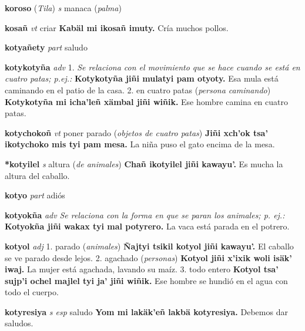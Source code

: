 \documentclass[10pt]{scrbook}
\newcommand{\entry}[1]{\textbf{#1}}
\newcommand{\onedefinition}[1]{#1.}
\newcommand{\nontranslationdef}[1]{\textit{#1}}
\newcommand{\partofspeech}[1]{\textit{#1}}
\newcommand{\spanishtranslation}[1]{#1}
\newcommand{\clarification}[1]{(\textit{#1})}
\newcommand{\cholexample}[1]{\textbf{#1}}
\newcommand{\exampletranslation}[1]{#1}
\newcommand{\relevantdialect}[1]{(\textit{#1})}
\begin{document}
\begin{multicols}{2}
\entry{koroso}
\relevantdialect{Tila}
\partofspeech{s}
\spanishtranslation{manaca}
\clarification{palma}

\entry{kosañ}
\partofspeech{vt}
\spanishtranslation{criar}
\cholexample{Kabäl mi ikosañ imuty.}
\exampletranslation{Cría muchos pollos.}

\entry{kotyañety}
\partofspeech{part}
\spanishtranslation{saludo}

\entry{kotykotyña}
\partofspeech{adv}
\onedefinition{1}
\nontranslationdef{Se relaciona con el movimiento que se hace cuando se está en cuatro patas; p.ej.:}
\cholexample{Kotykotyña jiñi mulatyi pam otyoty.}
\exampletranslation{Esa mula está caminando en el patio de la casa.}
\onedefinition{2}
\spanishtranslation{en cuatro patas}
\clarification{persona caminando}
\cholexample{Kotykotyña mi icha'leñ xämbal jiñi wiñik.}
\exampletranslation{Ese hombre camina en cuatro patas.}

\entry{kotychokoñ}
\partofspeech{vt}
\spanishtranslation{poner parado}
\clarification{objetos de cuatro patas}
\cholexample{Jiñi xch'ok tsa' ikotychoko mis tyi pam mesa.}
\exampletranslation{La niña puso el gato encima de la mesa.}

\entry{*kotyilel}
\partofspeech{s}
\spanishtranslation{altura}
\clarification{de animales}
\cholexample{Chañ ikotyilel jiñi kawayu'.}
\exampletranslation{Es mucha la altura del caballo.}

\entry{kotyo}
\partofspeech{part}
\spanishtranslation{adiós}

\entry{kotyokña}
\partofspeech{adv}
\nontranslationdef{Se relaciona con la forma en que se paran los animales; p. ej.:}
\cholexample{Kotyokña jiñi wakax tyi mal potyrero.}
\exampletranslation{La vaca está parada en el potrero.}

\entry{kotyol}
\partofspeech{adj}
\onedefinition{1}
\spanishtranslation{parado}
\clarification{animales}
\cholexample{Ñajtyi tsikil kotyol jiñi kawayu'.}
\exampletranslation{El caballo se ve parado desde lejos.}
\onedefinition{2}
\spanishtranslation{agachado}
\clarification{personas}
\cholexample{Kotyol jiñi x'ixik woli isäk' iwaj.}
\exampletranslation{La mujer está agachada, lavando su maíz.}
\onedefinition{3}
\spanishtranslation{todo entero}
\cholexample{Kotyol tsa' sujp'i ochel majlel tyi ja' jiñi wiñik.}
\exampletranslation{Ese hombre se hundió en el agua con todo el cuerpo.}

\entry{kotyresiya}
\partofspeech{s esp}
\spanishtranslation{saludo}
\cholexample{Yom mi lakäk'eñ lakbä kotyresiya.}
\exampletranslation{Debemos dar saludos.}


\end{multicols}
\end{document}
